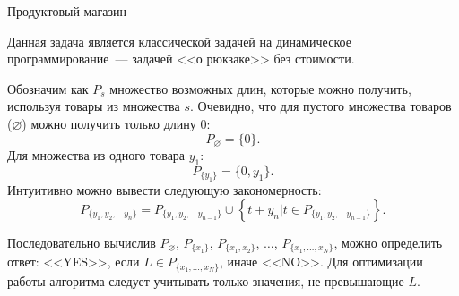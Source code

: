 \begin{tutorial}{Продуктовый магазин}

Данная задача является классической задачей на динамическое программирование~--- задачей <<о рюкзаке>> без стоимости.

Обозначим как $P_s$ множество возможных длин, которые можно получить, используя товары из множества $s$. Очевидно, что для пустого множества товаров ($\varnothing$) можно получить только длину 0: $$P_\varnothing = \{0\}.$$
Для множества из одного товара ${y_1}$: $$P_{\{y_1\}} = \{0, y_1\}.$$
Интуитивно можно вывести следующую закономерность: $$P_{\{y_1, y_2, \ldots y_n\}} = P_{\{y_1, y_2, \ldots y_{n-1}\}} \cup \left\{  t + y_n \Big| t \in P_{\{y_1, y_2, \ldots y_{n-1}\}} \right\}.$$

Последовательно вычислив $P_{\varnothing}$, $P_{\{x_1\}}$, $P_{\{x_1, x_2\}}$, $\ldots$, $P_{\{x_1, \ldots, x_N\}}$, можно определить ответ: <<YES>>, если $L \in P_{\{x_1, \ldots, x_N\}}$, иначе <<NO>>. Для оптимизации работы алгоритма следует учитывать только значения, не превышающие $L$.

\end{tutorial}

